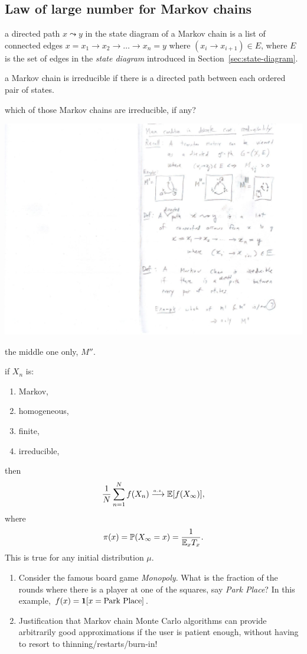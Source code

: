 \documentclass{article}
\begin{document}
\subsection{Law of large number for Markov chains}

 a directed path $x \leadsto y$ in the state diagram of a Markov chain is a list of connected edges $x = x_1 \to x_2 \to \dots \to x_n = y$ where $(x_i \to x_{i+1}) \in E$, where $E$ is the set of edges in the \emph{state diagram} introduced in Section~\ref{sec:state-diagram}.

 a Markov chain is irreducible if there is a directed path between each ordered pair of states.

 which of those Markov chains are irreducible, if any?
\begin{center}
	\includegraphics[width=0.6\linewidth]{figures/irred-example} 
\end{center}
 the middle one only, $M''$.

 if $X_n$ is:
\begin{enumerate}
  \item Markov,
  \item homogeneous,
  \item finite, 
  \item irreducible,
\end{enumerate}
then \[ \frac{1}{N} \sum_{n=1}^N f(X_n) \stackrel{\scriptscriptstyle a.s.}{\longrightarrow} {\mathbb E}[f(X_\infty)],\]
where \[\pi(x) = {\mathbb P}(X_\infty = x) = \frac{1}{{\mathbb E}_x T_x}. \] This is true for any initial distribution $\mu$.

\begin{enumerate}
	\item Consider the famous board game \emph{Monopoly}. What is the fraction of the rounds where there is a player at one of the squares, say \emph{Park Place}? In this example, $f(x) = {\mathbf 1}[x = \text{Park Place}]$.
	\item Justification that Markov chain Monte Carlo algorithms can provide arbitrarily good approximations if the user is patient enough, without having to resort to thinning/restarts/burn-in!
\end{enumerate}
\end{document}
